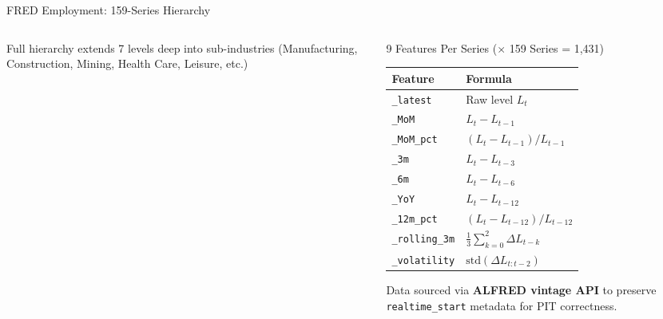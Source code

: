 \documentclass[aspectratio=169,10pt]{beamer}
\begin{document}
\begin{frame}{FRED Employment: 159-Series Hierarchy}
\begin{columns}[T]
\begin{column}{0.45\textwidth}
\begin{center}
\end{center}
\vspace{0.1cm}
\footnotesize
Full hierarchy extends 7 levels deep into sub-industries (Manufacturing, Construction, Mining, Health Care, Leisure, etc.)
\end{column}
\begin{column}{0.52\textwidth}
\begin{block}{9 Features Per Series ($\times$ 159 Series = 1{,}431)}
\footnotesize
\begin{tabular}{@{}ll@{}}
\toprule
\textbf{Feature} & \textbf{Formula} \\
\midrule
\texttt{\_latest} & Raw level $L_t$ \\
\texttt{\_MoM} & $L_t - L_{t-1}$ \\
\texttt{\_MoM\_pct} & $(L_t - L_{t-1}) / L_{t-1}$ \\
\texttt{\_3m} & $L_t - L_{t-3}$ \\
\texttt{\_6m} & $L_t - L_{t-6}$ \\
\texttt{\_YoY} & $L_t - L_{t-12}$ \\
\texttt{\_12m\_pct} & $(L_t - L_{t-12}) / L_{t-12}$ \\
\texttt{\_rolling\_3m} & $\frac{1}{3}\sum_{k=0}^{2} \Delta L_{t-k}$ \\
\texttt{\_volatility} & $\text{std}(\Delta L_{t:t-2})$ \\
\bottomrule
\end{tabular}
\end{block}
\footnotesize
Data sourced via \textbf{ALFRED vintage API} to preserve \texttt{realtime\_start} metadata for PIT correctness.
\end{column}
\end{columns}
\end{frame}
\end{document}
